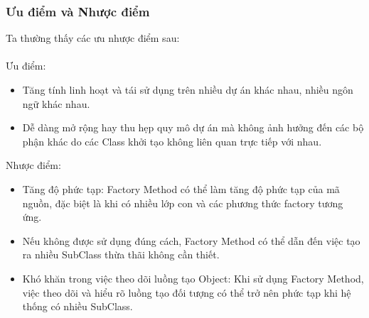 \subsubsection{Ưu điểm và Nhược điểm}
Ta thường thấy các ưu nhược điểm sau:\\\\
Ưu điểm:
\begin{itemize}
    \item Tăng tính linh hoạt và tái sử dụng trên nhiều dự án khác nhau, nhiều ngôn ngữ khác nhau.
    \item Dễ dàng mở rộng hay thu hẹp quy mô dự án mà không ảnh hưởng đến các bộ phận khác do các Class khởi tạo không liên quan trực tiếp với nhau.
\end{itemize}
Nhược điểm:
\begin{itemize}
    \item Tăng độ phức tạp: Factory Method có thể làm tăng độ phức tạp của mã nguồn, đặc biệt là khi có nhiều lớp con và các phương thức factory tương ứng.
    \item Nếu không được sử dụng đúng cách, Factory Method có thể dẫn đến việc tạo ra nhiều SubClass thừa thãi không cần thiết.
    \item Khó khăn trong việc theo dõi luồng tạo Object: Khi sử dụng Factory Method, việc theo dõi và hiểu rõ luồng tạo đối tượng có thể trở nên phức tạp khi hệ thống có nhiều SubClass.
\end{itemize}
